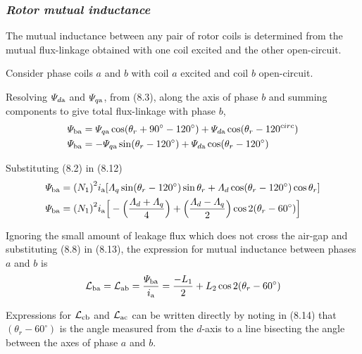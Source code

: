 \documentclass[a4paper,numbers=noenddot,12pt]{scrbook}
\begin{document}
    \subsubsection{\textit{Rotor mutual inductance}}
    The mutual inductance between any pair of rotor coils is determined from the mutual flux-linkage obtained with one coil excited and the other open-circuit.

    Consider phase coils $a$ and $b$ with coil $a$ excited and coil $b$ open-circuit.

    Resolving $\varPsi_{d\textup{a}}$ and $\varPsi_{q\textup{a}}$, from (8.3), along the axis of phase $b$ and summing components to give total flux-linkage with phase $b$,
    \begin{align}
        \varPsi_{\textup{ba}} & = \varPsi_{q\textup{a}} \cos (\theta_r + 90^{\circ} -120^{\circ}) +\varPsi_{d\textup{a}} \cos(\theta_r - 120^{circ}) \nonumber \\
        \varPsi_{\textup{ba}} & = -\varPsi_{q\textup{a}} \sin (\theta_r - 120^{\circ}) + \varPsi_{d\textup{a}} \cos(\theta_r -120^{\circ}) 
        \label{eq:Eq8.12}
    \end{align}

    Substituting (8.2) in (8.12)
    \begin{align}
        \varPsi_{\textup{ba}} & = {(N_1)}^2 i_{\textup{a}}[\varLambda_q \sin(\theta_r -120^{\circ}) \sin \theta_r + \varLambda_d \cos(\theta_r -120^{\circ}) \cos \theta_r] \nonumber \\
        \varPsi_{\textup{ba}} & = {(N_1)}^2 i_{\textup{a}} \Big[ - \Big( \dfrac{\varLambda_d + \varLambda_q}{4} \Big) + \Big( \dfrac{\varLambda_d - \varLambda_q}{2}\Big) \cos 2(\theta_r - 60^{\circ})\Big]
        \label{eq:Eq8.13}
    \end{align}

    Ignoring the small amount of leakage flux which does not cross the air-gap and substituting (8.8) in (8.13), the expression for mutual inductance between phases $a$ and $b$ is
    \begin{equation}
        \mathcal{L}_{\textup{ba}} = \mathcal{L}_{\textup{ab}} = \dfrac{\varPsi_{\textup{ba}}}{i_{\textup{a}}} = \dfrac{-L_1}{2} + L_2 \cos 2(\theta_r - 60^{\circ})
        \label{eq:Eq8.14}
    \end{equation}

    Expressions for $\mathcal{L}_{\textup{cb}}$ and $\mathcal{L}_{\textup{ac}}$ can be written directly by noting in (8.14) that $(\theta_r - 60^{\circ})$ is the angle measured from the $d$-axis to a line bisecting the angle between the axes of phase $a$ and $b$.
\end{document}
